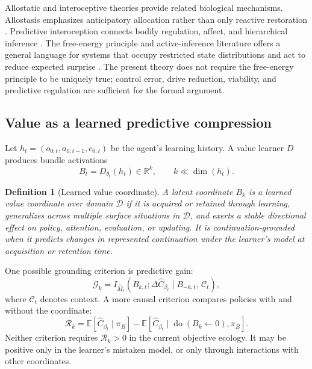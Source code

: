\documentclass[11pt]{article}
\newtheorem{definition}{Definition}
\newcommand{\E}{\mathbb{E}}
\newcommand{\R}{\mathbb{R}}
\newcommand{\doop}{\operatorname{do}}
\begin{document}
Allostatic and interoceptive theories provide related biological mechanisms. Allostasis emphasizes anticipatory allocation rather than only reactive restoration \citep{sterling2012}. Predictive interoception connects bodily regulation, affect, and hierarchical inference \citep{barrett2015,seth2016}. The free-energy principle and active-inference literature offers a general language for systems that occupy restricted state distributions and act to reduce expected surprise \citep{friston2010free,kirchhoff2018,zarncke2025stratification}. The present theory does not require the free-energy principle to be uniquely true; control error, drive reduction, viability, and predictive regulation are sufficient for the formal argument.

\subsection{Value as a learned predictive compression}

Let $h_t=(o_{0:t},a_{0:t-1},c_{0:t})$ be the agent's learning history. A value learner $D$ produces bundle activations
\begin{equation}
B_t=D_{\theta_t}(h_t)\in\R^k,
\qquad k\ll \dim(h_t).
\label{eq:bundle-encoder}
\end{equation}

\begin{definition}[Learned value coordinate]
A latent coordinate $B_k$ is a learned value coordinate over domain $\mathcal D$ if it is acquired or retained through learning, generalizes across multiple surface situations in $\mathcal D$, and exerts a stable directional effect on policy, attention, evaluation, or updating. It is continuation-grounded when it predicts changes in represented continuation under the learner's model at acquisition or retention time.
\end{definition}

One possible grounding criterion is predictive gain:
\begin{equation}
\mathcal G_k
=
I_{\widehat M_t}
\left(
B_{k,t};
\Delta\widehat C_{\beta_t}
\mid B_{-k,t},\,\mathcal C_t
\right),
\label{eq:grounding-info}
\end{equation}
where $\mathcal C_t$ denotes context. A more causal criterion compares policies with and without the coordinate:
\begin{equation}
\mathcal R_k
=
\E\!\left[
\widehat C_{\beta_t}\mid \pi_{B}
\right]
-
\E\!\left[
\widehat C_{\beta_t}\mid \doop(B_k\leftarrow 0),\pi_B
\right].
\label{eq:value-rent}
\end{equation}
Neither criterion requires $\mathcal R_k>0$ in the current objective ecology. It may be positive only in the learner's mistaken model, or only through interactions with other coordinates.
\end{document}

